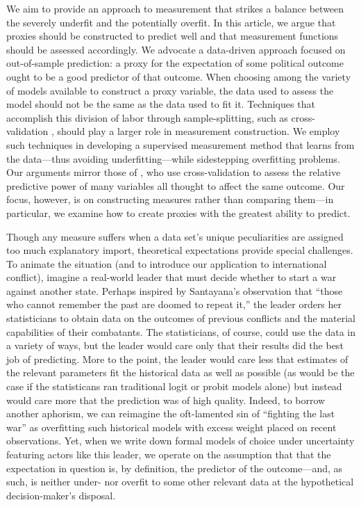 We aim to provide an approach to measurement that strikes a balance between the severely underfit and the potentially overfit.
In this article, we argue that proxies should be constructed to predict well and that measurement functions should be assessed accordingly.
We advocate a data-driven approach focused on out-of-sample prediction:  a proxy for the expectation of some political outcome ought to be a good predictor of that outcome.
When choosing among the variety of models available to construct a proxy variable, the data used to assess the model should not be the same as the data used to fit it.
Techniques that accomplish this division of labor through sample-splitting, such as cross-validation \citep{Efron:2012es}, should play a larger role in measurement construction.
We employ such techniques in developing a supervised measurement method that learns from the data---thus avoiding underfitting---while sidestepping overfitting problems.
Our arguments mirror those of \citet{Hill:2014ki}, who use cross-validation to assess the relative predictive power of many variables all thought to affect the same outcome.  Our focus, however, is on constructing measures rather than comparing them---in particular, we examine how to create proxies with the greatest ability to predict.

Though any measure suffers when a data set's unique peculiarities are assigned too much explanatory import, theoretical expectations provide special challenges.
To animate the situation (and to introduce our application to international conflict), imagine a real-world leader that must decide whether to start a war against another state.  Perhaps inspired by Santayana's observation that ``those who cannot remember the past are doomed to repeat it,'' the leader orders her statisticians to obtain data on the outcomes of previous conflicts and the material capabilities of their combatants.
The statisticians, of course, could use the data in a variety of ways, but the leader would care only that their results did the best job of predicting.
More to the point, the leader would care less that estimates of the relevant parameters fit the historical data as well as possible (as would be the case if the statisticans ran traditional logit or probit models alone) but instead would care more that the prediction was of high quality.
Indeed, to borrow another aphorism, we can reimagine the oft-lamented sin of ``fighting the last war'' \citep[e.g.][]{hart1972} as overfitting such historical models with excess weight placed on recent observations.
Yet, when we write down formal models of choice under uncertainty featuring actors like this leader, we operate on the assumption that that the expectation in question is, by definition, the predictor of the outcome---and, as such, is neither under- nor overfit to some other relevant data at the hypothetical decision-maker's disposal.

